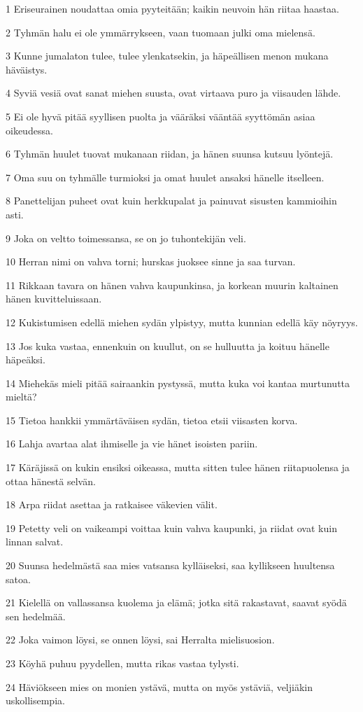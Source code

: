 \par 1 Eriseurainen noudattaa omia pyyteitään; kaikin neuvoin hän riitaa haastaa.
\par 2 Tyhmän halu ei ole ymmärrykseen, vaan tuomaan julki oma mielensä.
\par 3 Kunne jumalaton tulee, tulee ylenkatsekin, ja häpeällisen menon mukana häväistys.
\par 4 Syviä vesiä ovat sanat miehen suusta, ovat virtaava puro ja viisauden lähde.
\par 5 Ei ole hyvä pitää syyllisen puolta ja vääräksi vääntää syyttömän asiaa oikeudessa.
\par 6 Tyhmän huulet tuovat mukanaan riidan, ja hänen suunsa kutsuu lyöntejä.
\par 7 Oma suu on tyhmälle turmioksi ja omat huulet ansaksi hänelle itselleen.
\par 8 Panettelijan puheet ovat kuin herkkupalat ja painuvat sisusten kammioihin asti.
\par 9 Joka on veltto toimessansa, se on jo tuhontekijän veli.
\par 10 Herran nimi on vahva torni; hurskas juoksee sinne ja saa turvan.
\par 11 Rikkaan tavara on hänen vahva kaupunkinsa, ja korkean muurin kaltainen hänen kuvitteluissaan.
\par 12 Kukistumisen edellä miehen sydän ylpistyy, mutta kunnian edellä käy nöyryys.
\par 13 Jos kuka vastaa, ennenkuin on kuullut, on se hulluutta ja koituu hänelle häpeäksi.
\par 14 Miehekäs mieli pitää sairaankin pystyssä, mutta kuka voi kantaa murtunutta mieltä?
\par 15 Tietoa hankkii ymmärtäväisen sydän, tietoa etsii viisasten korva.
\par 16 Lahja avartaa alat ihmiselle ja vie hänet isoisten pariin.
\par 17 Käräjissä on kukin ensiksi oikeassa, mutta sitten tulee hänen riitapuolensa ja ottaa hänestä selvän.
\par 18 Arpa riidat asettaa ja ratkaisee väkevien välit.
\par 19 Petetty veli on vaikeampi voittaa kuin vahva kaupunki, ja riidat ovat kuin linnan salvat.
\par 20 Suunsa hedelmästä saa mies vatsansa kylläiseksi, saa kyllikseen huultensa satoa.
\par 21 Kielellä on vallassansa kuolema ja elämä; jotka sitä rakastavat, saavat syödä sen hedelmää.
\par 22 Joka vaimon löysi, se onnen löysi, sai Herralta mielisuosion.
\par 23 Köyhä puhuu pyydellen, mutta rikas vastaa tylysti.
\par 24 Häviökseen mies on monien ystävä, mutta on myös ystäviä, veljiäkin uskollisempia.

